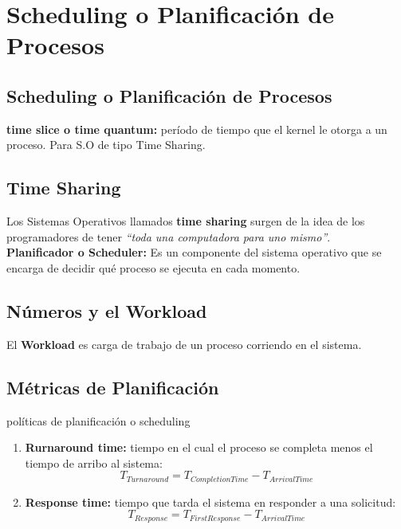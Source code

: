 \documentclass[../main.tex]{subfiles}
\begin{document}
\section{Scheduling o Planificación de Procesos}
    \subsection*{Scheduling o Planificación de Procesos}
        \textbf{time slice o time quantum:} período de tiempo que el kernel le otorga a un proceso. Para S.O de tipo Time Sharing.

    \subsection*{Time Sharing}
        Los Sistemas Operativos llamados \textbf{time sharing} surgen de la idea de los programadores de tener \textit{“toda una computadora para uno mismo”}.\\
        
        \textbf{Planificador o Scheduler:} Es un componente del sistema operativo que se encarga de decidir qué proceso se ejecuta en cada momento.

    \subsection*{Números y el Workload}
        El \textbf{Workload} es carga de trabajo de un proceso corriendo en el sistema.

    \subsection*{Métricas de Planificación}
        políticas de planificación o scheduling

        \begin{enumerate}
            \item \textbf{Rurnaround time:} tiempo en el cual el proceso se completa menos el tiempo de arribo al sistema:
                \begin{equation}
                    T_{Turnaround} = T_{Completion Time} - T_{Arrival Time}
                \end{equation}

            \item \textbf{Response time:} tiempo que tarda el sistema en responder a una solicitud:
                \begin{equation}
                    T_{Response} = T_{First Response} - T_{Arrival Time}
                \end{equation}
        \end{enumerate}
    
\end{document}
